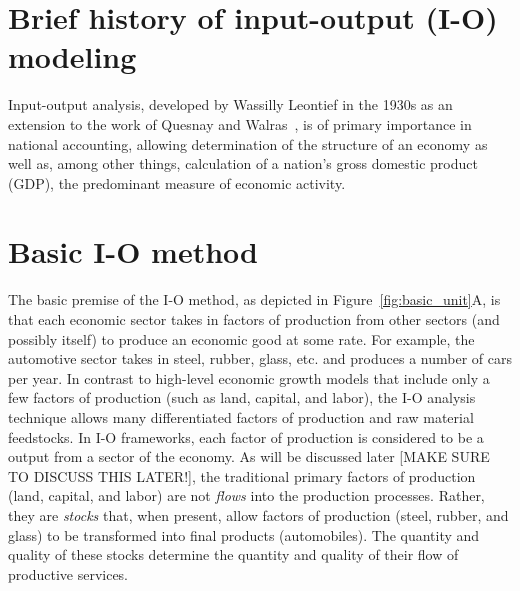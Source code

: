 \section{Brief history of input-output (I-O) modeling}

Input-output analysis, developed by Wassilly Leontief in the 1930s 
as an extension to the work of Quesnay and Walras~\cite{Leontief1936}, 
is of primary importance in national accounting, 
allowing determination of the structure of an economy as well as, 
among other things, 
calculation of a nation's gross domestic product (GDP), 
the predominant measure of economic activity.

\section{Basic I-O method}

The basic premise of the I-O method, 
as depicted in Figure~\ref{fig:basic_unit}A, 
is that each economic sector takes in factors of production 
from other sectors (and possibly itself) 
to produce an economic good at some rate. 
For example, the automotive sector takes in steel, rubber, glass, etc. 
and produces a number of cars per year. 
In contrast to high-level economic growth models 
that include only a few factors of production (such as land, capital, and labor), 
the I-O analysis technique allows many differentiated factors of production 
and raw material feedstocks.\cite{Costanza:1980ww} 
In I-O frameworks, each factor of production 
is considered to be a output from a sector of the economy. 
As will be discussed later [MAKE SURE TO DISCUSS THIS LATER!], 
the traditional primary factors of production (land, capital, and labor) 
are not \emph{flows} into the production processes. 
Rather, they are \emph{stocks} that, when present, 
allow factors of production (steel, rubber, and glass) 
to be transformed into final products (automobiles). 
The quantity and quality of these stocks 
determine the quantity and quality of their flow of productive services.

